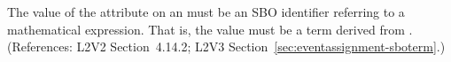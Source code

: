 The value of the  attribute on an \EventAssignment must be an
SBO identifier referring to a mathematical expression.  That is, the value
must be a term derived from \sbomathformula.  (References: L2V2 Section~4.14.2;
L2V3 Section~\ref{sec:eventassignment-sboterm}.)
